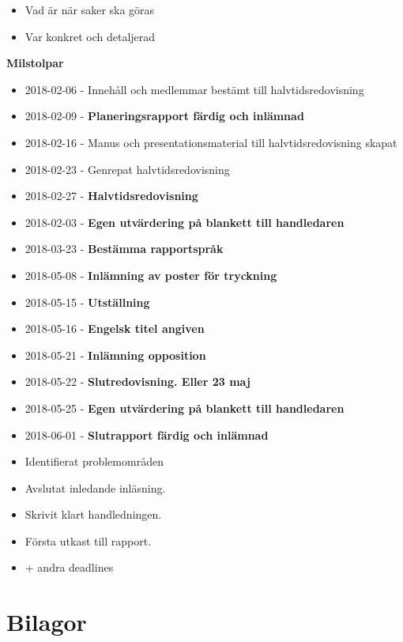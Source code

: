 \documentclass[12pt,a4paper]{article}
\begin{document}
\begin{itemize}
    \item Vad är när saker ska göras
    \item Var konkret och detaljerad
\end{itemize}

\textbf{Milstolpar}

\begin{itemize}
    \item 2018-02-06 - Innehåll och medlemmar bestämt till halvtidsredovisning
    \item 2018-02-09 - \textbf{Planeringsrapport färdig och inlämnad}
    \item 2018-02-16 - Manus och presentationsmaterial till halvtidsredovisning skapat
    \item 2018-02-23 - Genrepat halvtidsredovisning
    \item 2018-02-27 - \textbf{Halvtidsredovisning}
    \item 2018-02-03 - \textbf{Egen utvärdering på blankett till handledaren}
    \item 2018-03-23 - \textbf{Bestämma rapportspråk}
    \item 2018-05-08 - \textbf{Inlämning av poster för tryckning}
    \item 2018-05-15 - \textbf{Utställning}
    \item 2018-05-16 - \textbf{Engelsk titel angiven}
    \item 2018-05-21 - \textbf{Inlämning opposition}
    \item 2018-05-22 - \textbf{Slutredovisning. Eller 23 maj}
    \item 2018-05-25 - \textbf{Egen utvärdering på blankett till handledaren}
    \item 2018-06-01 - \textbf{Slutrapport färdig och inlämnad}
    \item Identifierat problemområden
    \item Avslutat inledande inläsning.
    \item Skrivit klart handledningen.
    \item Första utkast till rapport.
    \item + andra deadlines
\end{itemize}


\newpage
{}

 


\newpage
\section*{Bilagor}
\label{sec:bilaga}
\end{document}
